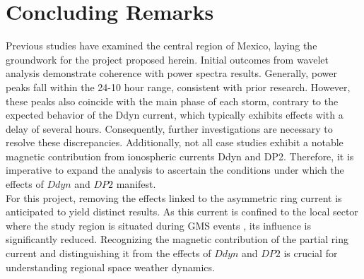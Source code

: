 \documentclass[12pt]{article}
\begin{document}
\section{Concluding Remarks}
\label{S:3}

Previous studies have examined the central region of Mexico, laying the groundwork for the project proposed herein. Initial outcomes from wavelet analysis demonstrate coherence with power spectra results. Generally, power peaks fall within the 24-10 hour range, consistent with prior research. However, these peaks also coincide with the main phase of each storm, contrary to the expected behavior of the Ddyn current, which typically exhibits effects with a delay of several hours. Consequently, further investigations are necessary to resolve these discrepancies. Additionally, not all case studies exhibit a notable magnetic contribution from ionospheric currents Ddyn and DP2. Therefore, it is imperative to expand the analysis to ascertain the conditions under which the effects of $Ddyn$ and $DP2$ manifest.\\ 

For this project, removing the effects linked to the asymmetric ring current is anticipated to yield distinct results. As this current is confined to the local sector where the study region is situated during GMS events \citep{partialringcurrentidx}, its influence is significantly reduced. Recognizing the magnetic contribution of the partial ring current and distinguishing it from the effects of $Ddyn$ and $DP2$ is crucial for understanding regional space weather dynamics.\\
\end{document}
